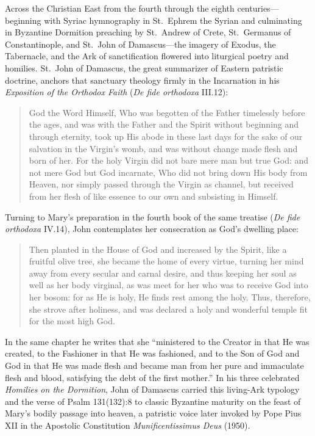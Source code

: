 Across the Christian East from the fourth through the eighth centuries---beginning with Syriac hymnography in St.\ Ephrem the Syrian and culminating in Byzantine Dormition preaching by St.\ Andrew of Crete, St.\ Germanus of Constantinople, and St.\ John of Damascus---the imagery of Exodus, the Tabernacle, and the Ark of sanctification flowered into liturgical poetry and homilies. St.\ John of Damascus, the great summarizer of Eastern patristic doctrine, anchors that sanctuary theology firmly in the Incarnation in his \textit{Exposition of the Orthodox Faith} (\textit{De fide orthodoxa} III.12):

\begin{quote}\small
God the Word Himself, Who was begotten of the Father timelessly before the ages, and was with the Father and the Spirit without beginning and through eternity, took up His abode in these last days for the sake of our salvation in the Virgin's womb, and was without change made flesh and born of her. For the holy Virgin did not bare mere man but true God: and not mere God but God incarnate, Who did not bring down His body from Heaven, nor simply passed through the Virgin as channel, but received from her flesh of like essence to our own and subsisting in Himself.
\end{quote}

Turning to Mary's preparation in the fourth book of the same treatise (\textit{De fide orthodoxa} IV.14), John contemplates her consecration as God's dwelling place:

\begin{quote}\small
Then planted in the House of God and increased by the Spirit, like a fruitful olive tree, she became the home of every virtue, turning her mind away from every secular and carnal desire, and thus keeping her soul as well as her body virginal, as was meet for her who was to receive God into her bosom: for as He is holy, He finds rest among the holy. Thus, therefore, she strove after holiness, and was declared a holy and wonderful temple fit for the most high God.
\end{quote}

In the same chapter he writes that she ``ministered to the Creator in that He was created, to the Fashioner in that He was fashioned, and to the Son of God and God in that He was made flesh and became man from her pure and immaculate flesh and blood, satisfying the debt of the first mother.'' In his three celebrated \textit{Homilies on the Dormition}, John of Damascus carried this living-Ark typology and the verse of Psalm 131(132):8 to classic Byzantine maturity on the feast of Mary's bodily passage into heaven, a patristic voice later invoked by Pope Pius XII in the Apostolic Constitution \textit{Munificentissimus Deus} (1950).

